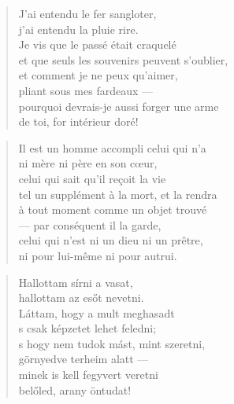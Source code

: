 
\begin{verse}
  J'ai entendu le fer sangloter, \\
  j'ai entendu la pluie rire. \\
  Je vis que le passé était craquelé \\
  et que seuls les souvenirs peuvent s'oublier, \\
  et comment je ne peux qu'aimer, \\
  pliant sous mes fardeaux --- \\
  pourquoi devrais-je aussi forger une arme \\
  de toi, for intérieur doré!
\end{verse}

\bigskip

\label{conscience_X}

\begin{verse}
  Il est un homme accompli celui qui n'a \\
  ni mère ni père en son cœur, \\
  celui qui sait qu'il reçoit la vie \\
  tel un supplément à la mort, et la rendra \\
  à tout moment comme un objet trouvé \\
  --- par conséquent il la garde, \\
  celui qui n'est ni un dieu ni un prêtre, \\
  ni pour lui-même ni pour autrui.
\end{verse}

\newpage


\vspace*{-15mm}
\centeredornament



\begin{verse}
  Hallottam sírni a vasat, \\
  hallottam az esőt nevetni. \\
  Láttam, hogy a mult meghasadt \\
  s csak képzetet lehet feledni; \\
  s hogy nem tudok mást, mint szeretni, \\
  görnyedve terheim alatt --- \\
  minek is kell fegyvert veretni \\
  belőled, arany öntudat!
\end{verse}

